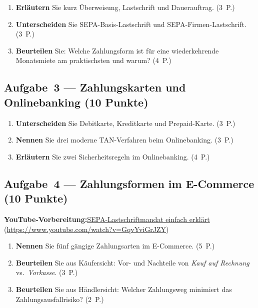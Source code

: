 \documentclass[11pt, a4paper]{article}
\begin{document}
\medskip
\begin{enumerate}[label=(\alph*)]
  \item \textbf{Erläutern} Sie kurz Überweisung, Lastschrift und Dauerauftrag. \hfill (3~P.)
  \item \textbf{Unterscheiden} Sie SEPA-Basis-Lastschrift und SEPA-Firmen-Lastschrift. \hfill (3~P.)
  \item \textbf{Beurteilen} Sie: Welche Zahlungsform ist für eine wiederkehrende Monatsmiete am praktischsten und warum? \hfill (4~P.)
\end{enumerate}

\subsection*{Aufgabe~3 --- Zahlungskarten und Onlinebanking (10 Punkte)}

\begin{enumerate}[label=(\alph*)]
  \item \textbf{Unterscheiden} Sie Debitkarte, Kreditkarte und Prepaid-Karte. \hfill (3~P.)
  \item \textbf{Nennen} Sie drei moderne TAN-Verfahren beim Onlinebanking. \hfill (3~P.)
  \item \textbf{Erläutern} Sie zwei Sicherheitsregeln im Onlinebanking. \hfill (4~P.)
\end{enumerate}

\subsection*{Aufgabe~4 --- Zahlungsformen im E-Commerce (10 Punkte)}

\noindent\textbf{\color{bfwAccent}YouTube-Vorbereitung:}\enspace \href{https://www.youtube.com/watch?v=GqvYviGrJZY}{SEPA-Lastschriftmandat einfach erklärt} (\url{https://www.youtube.com/watch?v=GqvYviGrJZY})

\medskip
\begin{enumerate}[label=(\alph*)]
  \item \textbf{Nennen} Sie fünf gängige Zahlungsarten im E-Commerce. \hfill (5~P.)
  \item \textbf{Beurteilen} Sie aus Käufersicht: Vor- und Nachteile von \emph{Kauf auf Rechnung} vs.\ \emph{Vorkasse}. \hfill (3~P.)
  \item \textbf{Beurteilen} Sie aus Händlersicht: Welcher Zahlungsweg minimiert das Zahlungsausfallrisiko? \hfill (2~P.)
\end{enumerate}
\end{document}
